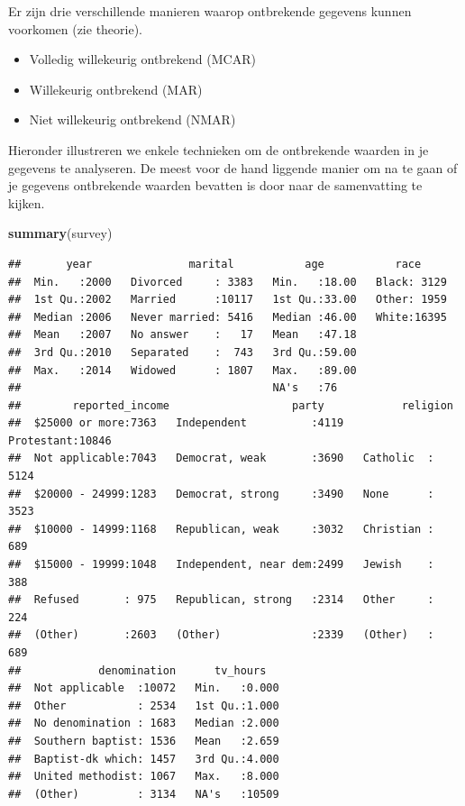 \documentclass[]{tufte-book}
\newenvironment{Shaded}{}{}
\newcommand{\KeywordTok}[1]{\textcolor[rgb]{0.00,0.44,0.13}{\textbf{#1}}}
\newcommand{\NormalTok}[1]{#1}
\providecommand{\tightlist}{%
  \setlength{\itemsep}{0pt}\setlength{\parskip}{0pt}}
\begin{document}
Er zijn drie verschillende manieren waarop ontbrekende gegevens kunnen voorkomen (zie theorie).

\begin{itemize}
\tightlist
\item
  Volledig willekeurig ontbrekend (MCAR)
\item
  Willekeurig ontbrekend (MAR)
\item
  Niet willekeurig ontbrekend (NMAR)
\end{itemize}

Hieronder illustreren we enkele technieken om de ontbrekende waarden in je gegevens te analyseren. De meest voor de hand liggende manier om na te gaan of je gegevens ontbrekende waarden bevatten is door naar de samenvatting te kijken.

\begin{Shaded}
\begin{Highlighting}[]
\KeywordTok{summary}\NormalTok{(survey)}
\end{Highlighting}
\end{Shaded}

\begin{verbatim}
##       year               marital           age           race      
##  Min.   :2000   Divorced     : 3383   Min.   :18.00   Black: 3129  
##  1st Qu.:2002   Married      :10117   1st Qu.:33.00   Other: 1959  
##  Median :2006   Never married: 5416   Median :46.00   White:16395  
##  Mean   :2007   No answer    :   17   Mean   :47.18                
##  3rd Qu.:2010   Separated    :  743   3rd Qu.:59.00                
##  Max.   :2014   Widowed      : 1807   Max.   :89.00                
##                                       NA's   :76                   
##        reported_income                   party            religion    
##  $25000 or more:7363   Independent          :4119   Protestant:10846  
##  Not applicable:7043   Democrat, weak       :3690   Catholic  : 5124  
##  $20000 - 24999:1283   Democrat, strong     :3490   None      : 3523  
##  $10000 - 14999:1168   Republican, weak     :3032   Christian :  689  
##  $15000 - 19999:1048   Independent, near dem:2499   Jewish    :  388  
##  Refused       : 975   Republican, strong   :2314   Other     :  224  
##  (Other)       :2603   (Other)              :2339   (Other)   :  689  
##            denomination      tv_hours    
##  Not applicable  :10072   Min.   :0.000  
##  Other           : 2534   1st Qu.:1.000  
##  No denomination : 1683   Median :2.000  
##  Southern baptist: 1536   Mean   :2.659  
##  Baptist-dk which: 1457   3rd Qu.:4.000  
##  United methodist: 1067   Max.   :8.000  
##  (Other)         : 3134   NA's   :10509
\end{verbatim}
\end{document}

